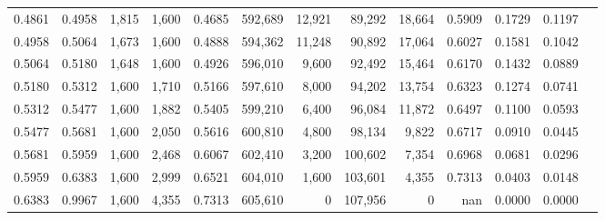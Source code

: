 \begin{tabular}{rrrrrrrrrrrrr}
0.4861 & 0.4958 &  1,815 & 1,600 &                                     0.4685 & 592,689 &  12,921 &  89,292 &  18,664 & 0.5909 & 0.1729 & 0.1197 \\
0.4958 & 0.5064 &  1,673 & 1,600 &                                     0.4888 & 594,362 &  11,248 &  90,892 &  17,064 & 0.6027 & 0.1581 & 0.1042 \\
0.5064 & 0.5180 &  1,648 & 1,600 &                                     0.4926 & 596,010 &   9,600 &  92,492 &  15,464 & 0.6170 & 0.1432 & 0.0889 \\
0.5180 & 0.5312 &  1,600 & 1,710 &                                     0.5166 & 597,610 &   8,000 &  94,202 &  13,754 & 0.6323 & 0.1274 & 0.0741 \\
0.5312 & 0.5477 &  1,600 & 1,882 &                                     0.5405 & 599,210 &   6,400 &  96,084 &  11,872 & 0.6497 & 0.1100 & 0.0593 \\
0.5477 & 0.5681 &  1,600 & 2,050 &                                     0.5616 & 600,810 &   4,800 &  98,134 &   9,822 & 0.6717 & 0.0910 & 0.0445 \\
0.5681 & 0.5959 &  1,600 & 2,468 &                                     0.6067 & 602,410 &   3,200 & 100,602 &   7,354 & 0.6968 & 0.0681 & 0.0296 \\
0.5959 & 0.6383 &  1,600 & 2,999 &                                     0.6521 & 604,010 &   1,600 & 103,601 &   4,355 & 0.7313 & 0.0403 & 0.0148 \\
0.6383 & 0.9967 &  1,600 & 4,355 &                                     0.7313 & 605,610 &       0 & 107,956 &       0 &    nan & 0.0000 & 0.0000 \\
\bottomrule
\end{tabular}
